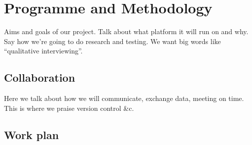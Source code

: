 \documentclass[10pt,a4paper,oneside]{report} \usepackage{graphicx}
\begin{document}


\clearpage
\section*{Programme and Methodology}

Aims and goals of our project. Talk about what platform it will run on
and why. Say how we're going to do research and testing. We want big
words like ``qualitative interviewing''.

\subsection*{Collaboration}
Here we talk about how we will communicate, exchange data, meeting on
time. This is where we praise version control \&c.


\begin{landscape}
\begin{center}
\hspace*{-1.5in}
\vspace*{-1.5in}
\section*{Work plan}
\end{center}
\end{landscape}
\end{document}
